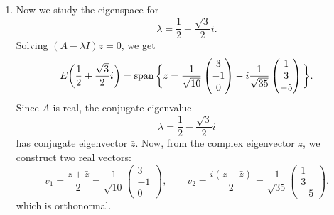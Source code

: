 \begin{example}
\begin{enumerate}
			\item Now we study the eigenspace for
				\begin{equation}
					\lambda = \frac{1}{2} + \frac{\sqrt{3}}{2}i.
				\end{equation}
				Solving $(A - \lambda I)z = 0$, we get
				\begin{equation}
					E\bigg(\frac{1}{2} + \frac{\sqrt{3}}{2}i\bigg)
					=
					\operatorname{span} \bigg\{
					z =
					\frac{1}{\sqrt{10}}
					\begin{pmatrix}
						3 \\
						-1 \\
						0
					\end{pmatrix}
					-
					i \frac{1}{\sqrt{35}}
					\begin{pmatrix}
						1 \\
						3 \\
						-5
					\end{pmatrix}
					\bigg\}.
				\end{equation}
				Since $A$ is real, the conjugate eigenvalue
				\begin{equation}
					\bar{\lambda} = \frac{1}{2} - \frac{\sqrt{3}}{2}i
				\end{equation}
				has conjugate eigenvector $\bar{z}$. Now, from the complex eigenvector $z$, we construct two real vectors:
				\begin{equation}
					v_1 = \frac{z + \bar{z}}{2} = \frac{1}{\sqrt{10}} \begin{pmatrix} 3 \\ -1 \\ 0 \end{pmatrix},
					\qquad
					v_2 = \frac{i(z - \bar{z})}{2} = \frac{1}{\sqrt{35}} \begin{pmatrix} 1 \\ 3 \\ -5 \end{pmatrix}.
				\end{equation}
				which is orthonormal. 
		\end{enumerate}


\end{example}

